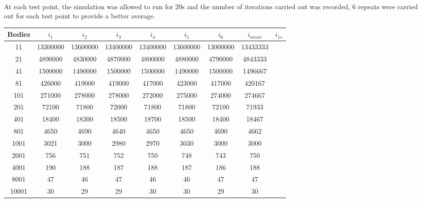 \paragraph{}
At each test point, the simulation was allowed to run for 20s and the number of iterations carried out was recorded, 6 repeats were carried out for each test point to provide a better average.\\

\begin{table}[h]
\footnotesize
\centering
\def\arraystretch{1.5}
\begin{tabular}{|c|c|c|c|c|c|c|c|c|} \hline
Bodies & $i_1$ & $i_2$ & $i_3$ & $i_4$ & $i_5$ & $i_6$ & $i_{mean}$ & $i_{1s}$ \\ \hline
    11 & 13300000 & 13600000 & 13400000 & 13400000 & 13600000 & 13000000 & 13433333 &\\ \hline
    21 &  4890000 &  4830000 &  4870000 &  4800000 &  4880000 &  4790000 &  4843333 &\\ \hline
    41 &	1500000	&  1490000 &	1500000 &  1500000 &	1490000 &  1500000 &  1496667 &\\ \hline
    81 &   426000 &   419000 &   419000 &   417000 &   423000 &   417000 &   420167 &\\ \hline
   101 &   271000 &   278000 &   278000 &   272000 &   275000 &   274000 &   274667 &\\ \hline
   201 &    72100 &    71800 &    72000 &    71800 &    71800 &    72100 &    71933 &\\ \hline
   401 &    18400 &    18300 &    18500	&    18700 &    18500 &    18400 &    18467 &\\ \hline
   801 &     4650	&     4690 &     4640 &   	4650 &     4650 &    	4690 &     4662 &\\ \hline
  1001 &     3021	&     3000 &     2980 &   	2970 &     3030 &   	3000 &     3000 &\\ \hline
  2001 &      756	&      751 &	    752 &	     750 &	    748 &	     743 &      750 &\\ \hline
  4001 &      190 &	     188 &	    187 &      188 &	    187 &    	 186 &      188 &\\ \hline
  8001 &       47 &	      46 &       47 &	      46 &       46 &	      47 &       47 &\\ \hline
 10001 &       30 &	      29 &       29 &	      30 &       30 &	      29 &       30 &\\ \hline


\end{tabular}
\end{table}